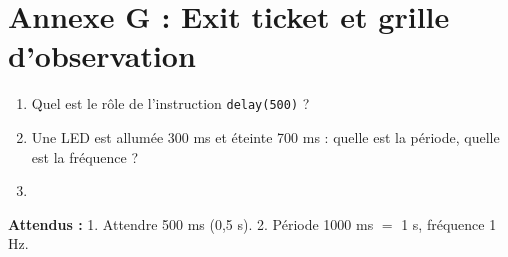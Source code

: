\documentclass[11pt,a4paper]{article}
\begin{document}
\newpage
\section*{Annexe G : Exit ticket et grille d'observation}

\begin{enumerate}
 \item Quel est le rôle de l'instruction \texttt{delay(500)} ?\\ \lig
 \item Une LED est allumée 300 ms et éteinte 700 ms : quelle est la période, quelle est la fréquence ?\\ \lig
 \item \autoeval
\end{enumerate}
\textbf{Attendus :} 1. Attendre 500 ms (0,5 s). 2. Période 1000 ms $=$ 1 s, fréquence 1 Hz.

\bigskip
{}
\end{document}
